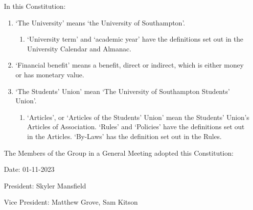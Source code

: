 \documentclass[12pt]{constitution}
\begin{document}
In this Constitution:
\begin{enumerate}
    \item `The University' means `the University of Southampton'.
    \begin{enumerate}
        \item `University term' and `academic year' have the definitions set out in the University Calendar and Almanac.
    \end{enumerate}

    \item `Financial benefit' means a benefit, direct or indirect, which is either money or has monetary value.
    \item `The Students' Union' mean `The University of Southampton Students' Union'.
    \begin{enumerate}
        \item `Articles', or `Articles of the Students' Union' mean the Students' Union's Articles of Association. `Rules' and `Policies' have the definitions set out in the Articles. `By-Laws' has the definition set out in the Rules.
    \end{enumerate}
\end{enumerate}


\label{clause:declaration}

The Members of the Group in a General Meeting adopted this Constitution:

Date: 01-11-2023

President: Skyler Mansfield

Vice President: Matthew Grove, Sam Kitson
\end{document}
